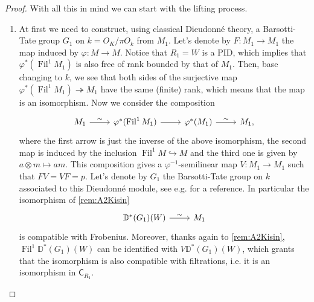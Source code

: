 \begin{proof}
With all this in mind we can start with the lifting process.
\begin{enumerate}
\item	At first we need to construct, using classical Dieudonné theory,
	a Barsotti-Tate group $G_1$ on $k = O_K/\pi O_k$ from $M_1$.
	Let's denote by $F\colon M_1 \to M_1$ the map induced by
	$\varphi\colon M \to M$.
	Notice that \(R_1 = W\) is a PID, which implies that
	\(\varphi^*(\operatorname{Fil}^1 M_1)\) is also free of rank 
	bounded by that of \(M_1\).
	Then, base changing to \(k\), we see that both sides of the surjective map
	$\varphi^* ( \operatorname{Fil}^1 M_1) \twoheadrightarrow M_1$
	have the same (finite) rank,
	which means that the map is an isomorphism.
	Now we consider the composition
	\begin{equation*}
	\begin{tikzcd}
		M_1 \arrow[r, "\sim", rightarrow] &
		\varphi^* (\operatorname{Fil}^1 M_1) \arrow[r, "", rightarrow] &
		\varphi^* (M_1) \arrow[r, "\sim", rightarrow] &
		M_1
	,\end{tikzcd}
	\end{equation*}
	where the first arrow is just the inverse of the above isomorphism, the second map
	is induced by the inclusion $\operatorname{Fil}^1 M \hookrightarrow M$ and the
	third one is given by $a \otimes m \mapsto am$.
	This composition gives a $\varphi^{-1}$-semilinear map $V\colon M_1 \to M_1$
	such that $FV = VF = p$.
	Let's denote by $G_1$ the Barsotti-Tate group on $k$ associated to this
	Dieudonné module, see e.g. \cite[Proposition 7.2.6]{Brinon} for a reference.
	In particular the isomorphism of \cref{rem:A2Kisin}
	\begin{equation*}
	\begin{tikzcd}[row sep = 0ex
		,/tikz/column 1/.append style={anchor=base east}
		,/tikz/column 2/.append style={anchor=base west}]
		\mathbb{D}^*(G_1)(W) \arrow[r, "\sim", rightarrow] &
		M_1
	\end{tikzcd}
	\end{equation*} 
	is compatible with Frobenius.
	Moreover, thanks again to \cref{rem:A2Kisin}, $\operatorname{Fil}^1 \mathbb{D}^*(G_1)(W)$
	can be identified with $V \mathbb{D}^*(G_1)(W)$, which grants that the isomorphism
	is also compatible with filtrations, 
	i.e$.$ it is an isomorphism in \(\mathsf{C}_{ R_1 }\).


\end{enumerate}
\end{proof}
